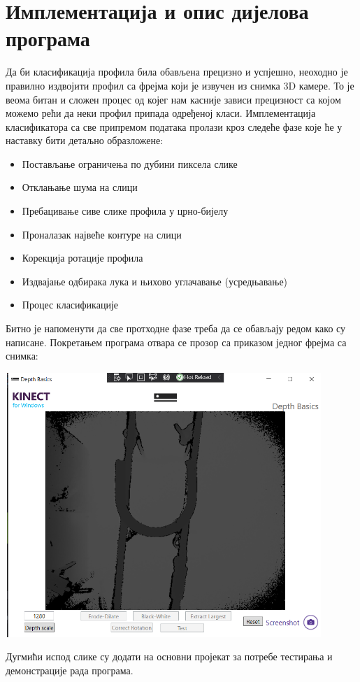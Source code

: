 \documentclass[12pt]{article}
\begin{document}
\section{Имплементација и опис дијелова програма}
Да би класификација профила била обављена прецизно и успјешно, неоходно је правилно издвојити профил са фрејма који је извучен из снимка 3D камере. То је веома битан и сложен процес од којег нам касније зависи прецизност са којом можемо рећи да неки профил припада одређеној класи. Имплементација класификатора са све припремом података пролази кроз следеће фазе које ће у наставку бити детаљно образложене:
\begin{itemize}
    \item Постављање ограничења по дубини пиксела слике
    \item Отклањање шума на слици 
    \item Пребацивање сиве слике профила у црно-бијелу
    \item Проналазак највеће контуре на слици
    \item Корекција ротације профила
    \item Издвајање одбирака лука и њихово углачавање (усредњавање)
    \item Процес класификације
\end{itemize}
\indent\indent Битно је напоменути да све протходне фазе треба да се обављају редом како су написане. Покретањем програма отвара се прозор са приказом једног фрејма са снимка:
\vspace{0.5cm}
\begin{center}
    \centering 
    \includegraphics[height=10cm, width=12cm]{images/0_main_window.png}
\end{center}
\vspace{0.5cm}
Дугмићи испод слике су додати на основни пројекат за потребе тестирања и демонстрације рада програма.
\end{document}
